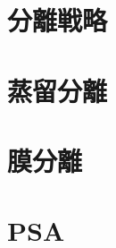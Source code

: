 \documentclass[11pt,aspectratio=43,dvipsnames]{beamer}
\begin{document}
\setcounter{framenumber}{9}
\section{分離戦略}
\section{蒸留分離}
\section{膜分離}
\section{PSA}
\end{document}
